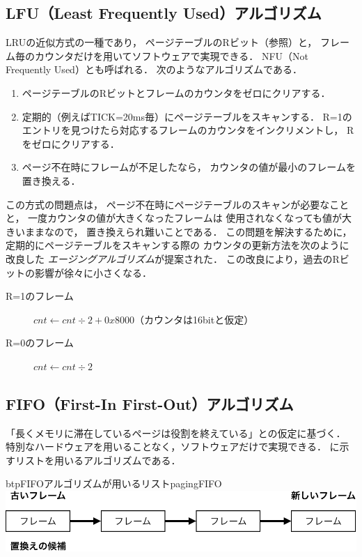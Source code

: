 \subsection{LFU（Least Frequently Used）アルゴリズム}
LRUの近似方式の一種であり，
ページテーブルのRビット（参照）と，
フレーム毎のカウンタだけを用いてソフトウェアで実現できる．
NFU（Not Frequently Used）とも呼ばれる．
次のようなアルゴリズムである．

\begin{enumerate}
\item ページテーブルのRビットとフレームのカウンタをゼロにクリアする．
\item 定期的（例えばTICK=20ms毎）にページテーブルをスキャンする．
  R=1のエントリを見つけたら対応するフレームのカウンタをインクリメントし，
  Rをゼロにクリアする．
\item ページ不在時にフレームが不足したなら，
  カウンタの値が最小のフレームを置き換える．
\end{enumerate}

この方式の問題点は，
ページ不在時にページテーブルのスキャンが必要なことと，
一度カウンタの値が大きくなったフレームは
使用されなくなっても値が大きいままなので，
置き換えられ難いことである．
この問題を解決するために，
定期的にページテーブルをスキャンする際の
カウンタの更新方法を次のように改良した
\emph{エージングアルゴリズム}が提案された．
この改良により，過去のRビットの影響が徐々に小さくなる．

\begin{description}
\item[R=1のフレーム]
  $cnt \leftarrow cnt \div 2 + 0x8000$（カウンタは16bitと仮定）
\item[R=0のフレーム]
$cnt \leftarrow cnt \div 2$
\end{description}

\subsection{FIFO（First-In First-Out）アルゴリズム}
「長くメモリに滞在しているページは役割を終えている」との仮定に基づく．
特別なハードウェアを用いることなく，ソフトウェアだけで実現できる．
に示すリストを用いるアルゴリズムである．

\begin{myfig}{btp}{FIFOアルゴリズムが用いるリスト}{pagingFIFO}
  \includegraphics[scale=0.66]{Fig/pagingFIFO-crop.pdf}
\end{myfig}

